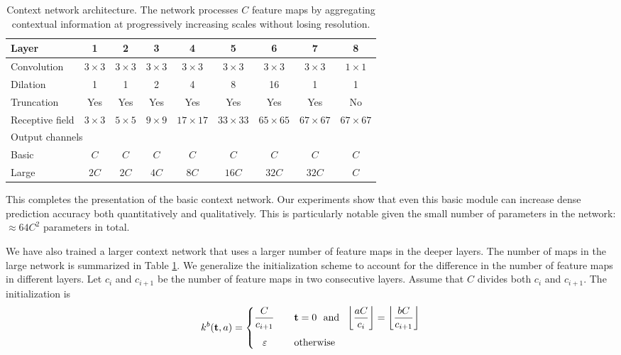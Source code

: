 \documentclass{article} %
\def\tt{\mathbf t}
\newcommand{\timess}{\mathbin{\!\times\!}}
\begin{document}
\begin{table}
\centering
\small
\begin{tabular}{|l|c|c|c|c|c|c|c|c|}
\hline
Layer 							& 1 & 2 & 3 & 4 & 5 & 6 & 7 & 8 \\ \hline \hline
Convolution 					& $3\timess 3$ & $3\timess 3$ & $3\timess 3$ & $3\timess 3$ & $3\timess 3$ & $3\timess 3$ & $3\timess 3$ & $1\timess 1$ \\ \hline
Dilation	                  	& 1 & 1 & 2 & 4 & 8 & 16 & 1 & 1 \\ \hline
Truncation					  	& Yes & Yes & Yes & Yes & Yes & Yes & Yes & No \\ \hline
Receptive field	               	& $3\timess 3$ & $5\timess 5$ & $9\timess 9$ & $17\timess 17$ & $33\timess 33$ & $65\timess 65$ & $67\timess 67$ & $67\timess 67$ \\ \hline \hline
\multicolumn{9}{|l|}{Output channels}				    			\\ \hline
Basic	                  	& $C$ & $C$ & $C$ & $C$ & $C$ & $C$ & $C$ & $C$ \\ \hline
Large	                  	& $2C$ & $2C$ & $4C$ & $8C$ & $16C$ & $32C$ & $32C$ & $C$ \\ \hline
\end{tabular}
\caption{Context network architecture. The network processes $C$ feature maps by aggregating contextual information at progressively increasing scales without losing resolution.}
\label{tab:layers}
\vspace{-3mm}
\end{table}

This completes the presentation of the basic context network. Our experiments show that even this basic module can increase dense prediction accuracy both quantitatively and qualitatively. This is particularly notable given the small number of parameters in the network: $\approx\! 64C^2$ parameters in total.

We have also trained a larger context network that uses a larger number of feature maps in the deeper layers. The number of maps in the large network is summarized in Table \ref{tab:layers}.
We generalize the initialization scheme to account for the difference in the number of feature maps in different layers. Let $c_i$ and $c_{i+1}$ be the number of feature maps in two consecutive layers. Assume that $C$ divides both $c_i$ and $c_{i+1}$. The initialization is
\begin{equation}
  k^b (\tt, a) = \begin{cases}
  \displaystyle {C \over c_{i+1}} \quad & \displaystyle \tt = 0 \textup{\ \ and\ \ } \left\lfloor{a C \over c_i}\right\rfloor = \left\lfloor{b C \over c_{i+1}}\right\rfloor \vspace{2mm}\\
  \quad \!\varepsilon \quad & \displaystyle \textup{otherwise}
  \end{cases}
\end{equation}
\end{document}

